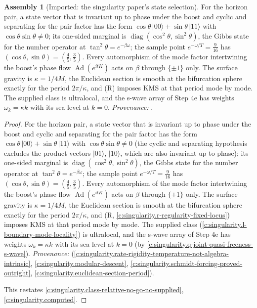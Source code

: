 \documentclass[11pt]{article}
\theoremstyle{definition}
\newtheorem{assembled}[theorem]{Assembly}
\theoremstyle{plain}
\providecommand{\ket}{}\renewcommand{\ket}[1]{|#1\rangle}
\begin{document}
\begin{assembled}[Imported: the singularity paper's state selection]\label{c:angle.imported-singularity-papers-state-selection}
For the horizon pair, a state vector that is invariant up to phase under the boost and cyclic and separating for the pair factor has the form $\cos\theta\,\ket{00} + \sin\theta\,\ket{11}$ with $\cos\theta\sin\theta \neq 0$; its one-sided marginal is $\operatorname{diag}(\cos^{2}\theta, \sin^{2}\theta)$, the Gibbs state for the number operator at $\tan^{2}\theta = e^{-\beta\omega}$; the sample point $e^{-\omega/T} = \tfrac{9}{16}$ has $(\cos\theta, \sin\theta) = (\tfrac45, \tfrac35)$. Every automorphism of the mode factor intertwining the boost's phase flow $\operatorname{Ad}(e^{itK})$ acts on $\beta$ through $\{\pm 1\}$ only. The surface gravity is $\kappa = 1/4M$, the Euclidean section is smooth at the bifurcation sphere exactly for the period $2\pi/\kappa$, and (R) imposes KMS at that period mode by mode. The supplied class is ultralocal, and the s-wave array of Step 4e has weights $\omega_{k} = \kappa k$ with its sea level at $k = 0$. \emph{Provenance:} \cite[Lem.~7.2, Thm.~7.3, Thm.~7.16, Prop.~7.18, Prem.~7.19, Prop.~7.25, Rem.~7.26, Prem.~7.30, Rem.~7.33, Prem.~8.1, Thm.~C.8, Rem.~C.9, Prop.~A.2]{ButlerT5}.
\end{assembled}
\begin{proof}
For the horizon pair, a state vector that is invariant up to phase under the boost and cyclic and separating for the pair factor has the form $\cos\theta\,\ket{00} + \sin\theta\,\ket{11}$ with $\cos\theta\sin\theta \neq 0$ (the cyclic and separating hypothesis excludes the product vectors $\ket{01}$, $\ket{10}$, which are also invariant up to phase); its one-sided marginal is $\operatorname{diag}(\cos^{2}\theta, \sin^{2}\theta)$, the Gibbs state for the number operator at $\tan^{2}\theta = e^{-\beta\omega}$; the sample point $e^{-\omega/T} = \tfrac{9}{16}$ has $(\cos\theta, \sin\theta) = (\tfrac45, \tfrac35)$. Every automorphism of the mode factor intertwining the boost's phase flow $\operatorname{Ad}(e^{itK})$ acts on $\beta$ through $\{\pm 1\}$ only. The surface gravity is $\kappa = 1/4M$, the Euclidean section is smooth at the bifurcation sphere exactly for the period $2\pi/\kappa$, and (R, \ref{c:singularity.r-regularity-fixed-locus}) imposes KMS at that period mode by mode. The supplied class (\ref{c:singularity.l-boundary-mode-locality}) is ultralocal, and the s-wave array of Step 4e has weights $\omega_{k} = \kappa k$ with its sea level at $k = 0$ (by \ref{c:singularity.q-joint-quasi-freeness-s-wave}). \emph{Provenance:} \cite[Lem.~7.2, Thm.~7.3, Thm.~7.16, Prop.~7.18, Prem.~7.19, Prop.~7.25, Rem.~7.26, Prem.~7.30, Rem.~7.33, Prem.~8.1, Thm.~C.8, Rem.~C.9, Prop.~A.2]{ButlerT5} (\ref{c:singularity.rate-rigidity-temperature-not-algebra-intrinsic}, \ref{c:singularity.modular-descent}, \ref{c:singularity.schmidt-forcing-proved-outright}, \ref{c:singularity.euclidean-section-period}).

This restates \ref{c:singularity.class-relative-no-go-no-supplied}, \ref{c:singularity.computed}.

\end{proof}
\end{document}
